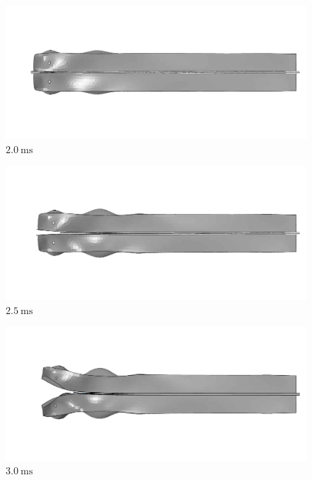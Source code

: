 \documentclass[
documentsize = a4, %
font = cmr, %
typesize = 11, %
printmode = true,
onehalfspacing = true,
language = en, %
titlepage = udciccp, %
degree = pt, %
dedication = true,
acknowledgements = true,
abstract-en = true,
abstract-es = false,
abstract-ga = false,
epigraphs = true,
toc = true,
lof = true,
lot = true,
frontmatterintoc = false,
notation = false,
minimal = false,
]{UDCthesis}
\begin{document}
\begin{figure}
	\centering
	\begin{minipage}[b]{.48\linewidth}
	\centering
	\begin{minipage}[b]{\linewidth}
		\centering
		\includegraphics[width=\linewidth]{IMG_CUTRES/gppb67}
		$\SI{2.0}{\ms}$
	\end{minipage}
	\quad
	\begin{minipage}[b]{\linewidth}
		\centering
		\includegraphics[width=\linewidth]{IMG_CUTRES/gppb84}
		$\SI{2.5}{\ms}$
	\end{minipage}
	\quad
	\begin{minipage}[b]{\linewidth}
		\centering
		\includegraphics[width=\linewidth]{IMG_CUTRES/gppb100}
		$\SI{3.0}{\ms}$
	\end{minipage}
	\end{minipage}

\end{figure}
\end{document}
